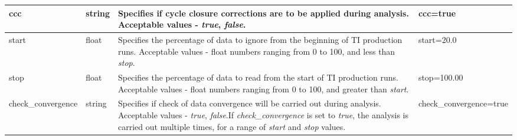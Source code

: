 \documentclass[11pt,letterpaper,titlepage]{article}
\begin{document}
\begin{footnotesize}
\begin{landscape}
\begin{center}
\begin{longtable}[1]{p{3cm}|p{0.5cm}|p{11cm}|p{4cm}}
\hline
ccc                & string          & Specifies if cycle closure corrections are to be applied during analysis. Acceptable values - \textit{true}, \textit{false}. & ccc=true  \\ 
\hline
start              & float           & Specifies the percentage of data to ignore from the beginning of TI production runs. Acceptable values - float numbers ranging from 0 to 100, and less than \textit{stop}.  & start=20.0  \\ 
\hline
stop               & float           & Specifies the percentage of data to read from the start of TI production runs. Acceptable values - float numbers ranging from 0 to 100, and greater than \textit{start}.  & stop=100.00   \\ 
\hline
check\_convergence & string          & Specifies if check of data convergence will be carried out during analysis. Acceptable values - \textit{true}, \textit{false}.\newline If \textit{check\_convergence} is set to \textit{true}, the analysis is carried out multiple times, for a range of \textit{start} and \textit{stop} values. & check\_convergence=true  \\
\hline
\end{longtable}
\end{center}
\end{landscape}
\end{footnotesize}
\end{document}
